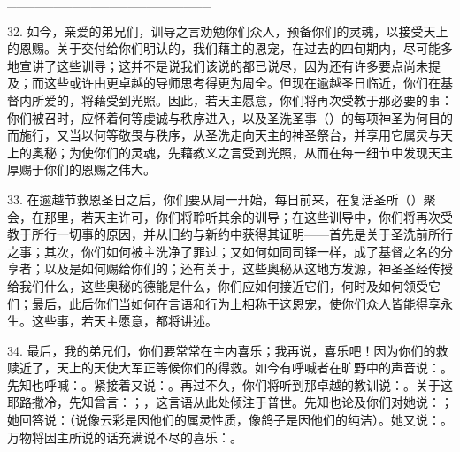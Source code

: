 \_\_\_\_\_\_\_\_\_\_\_\_\_\_\_\_\_\_\_\_\_\_\par

32. 如今，亲爱的弟兄们，训导之言劝勉你们众人，预备你们的灵魂，以接受天上的恩赐。关于交付给你们明认的，我们藉主的恩宠，在过去的四旬期内，尽可能多地宣讲了这些训导；这并不是说我们该说的都已说尽，因为还有许多要点尚未提及；而这些或许由更卓越的导师思考得更为周全。但现在逾越圣日临近，你们在基督内所爱的，将藉受到光照。因此，若天主愿意，你们将再次受教于那必要的事：你们被召时，应怀着何等虔诚与秩序进入，以及圣洗圣事（）的每项神圣为何目的而施行，又当以何等敬畏与秩序，从圣洗走向天主的神圣祭台，并享用它属灵与天上的奥秘；为使你们的灵魂，先藉教义之言受到光照，从而在每一细节中发现天主厚赐于你们的恩赐之伟大。\par

33. 在逾越节救恩圣日之后，你们要从周一开始，每日前来，在复活圣所（）聚会，在那里，若天主许可，你们将聆听其余的训导；在这些训导中，你们将再次受教于所行一切事的原因，并从旧约与新约中获得其证明——首先是关于圣洗前所行之事；其次，你们如何被主洗净了罪过；又如何如同司铎一样，成了基督之名的分享者；以及是如何赐给你们的；还有关于，这些奥秘从这地方发源，神圣圣经传授给我们什么，这些奥秘的德能是什么，你们应如何接近它们，何时及如何领受它们；最后，此后你们当如何在言语和行为上相称于这恩宠，使你们众人皆能得享永生。这些事，若天主愿意，都将讲述。\par

34. 最后，我的弟兄们，你们要常常在主内喜乐；我再说，喜乐吧！因为你们的救赎近了，天上的天使大军正等候你们的得救。如今有呼喊者在旷野中的声音说：。先知也呼喊：。紧接着又说：。再过不久，你们将听到那卓越的教训说：。关于这耶路撒冷，先知曾言：；，这言语从此处倾注于普世。先知也论及你们对她说：；她回答说：（说像云彩是因他们的属灵性质，像鸽子是因他们的纯洁）。她又说：。万物将因主所说的话充满说不尽的喜乐：。\par


